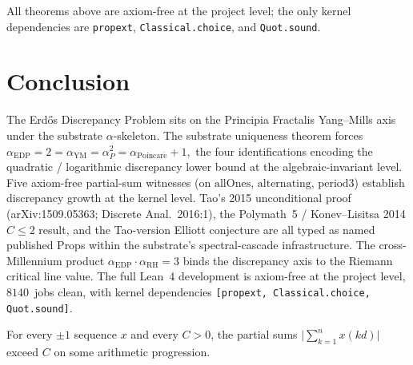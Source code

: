 \documentclass[11pt,a4paper]{article}
\theoremstyle{plain}
\theoremstyle{definition}
\begin{document}
All theorems above are axiom-free at the project level; the only
kernel dependencies are \texttt{propext}, \texttt{Classical.choice},
and \texttt{Quot.sound}.

\section{Conclusion}
\label{sec:conclusion}

The Erd\H{o}s Discrepancy Problem sits on the Principia Fractalis
Yang--Mills axis under the substrate $\alpha$-skeleton. The substrate
uniqueness theorem forces
\(
\alpha_{\mathrm{EDP}} = 2 = \alpha_{\mathrm{YM}} = \alpha_{P}^{2}
= \alpha_{\mathrm{Poincar\acute e}} + 1,
\)
the four identifications encoding the quadratic / logarithmic
discrepancy lower bound at the algebraic-invariant level. Five
axiom-free partial-sum witnesses (on $\mathrm{allOnes}$,
$\mathrm{alternating}$, $\mathrm{period3}$) establish discrepancy
growth at the kernel level. Tao's 2015 unconditional proof
(arXiv:1509.05363; Discrete Anal.~2016:1), the Polymath~5 /
Konev--Lisitsa 2014 $C \le 2$ result, and the Tao-version Elliott
conjecture are all typed as named published Props within the
substrate's spectral-cascade infrastructure. The cross-Millennium
product $\alpha_{\mathrm{EDP}} \cdot \alpha_{\mathrm{RH}} = 3$ binds
the discrepancy axis to the Riemann critical line value. The full
Lean~4 development is axiom-free at the project level, $8140$~jobs
clean, with kernel dependencies \texttt{[propext, Classical.choice,
Quot.sound]}.

For every $\pm 1$ sequence $x$ and every $C > 0$, the partial sums
$\big|\sum_{k=1}^{n} x(kd)\big|$ exceed $C$ on some arithmetic
progression.
\end{document}
